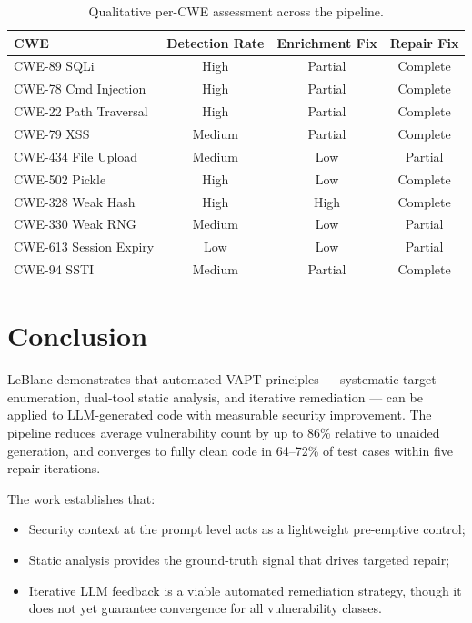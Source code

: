 \documentclass[11pt,a4paper]{article}
\begin{document}
\begin{table}[H]
\centering\small
\begin{tabular}{@{}lccc@{}}
\toprule
\textbf{CWE} & \textbf{Detection Rate} & \textbf{Enrichment Fix} & \textbf{Repair Fix} \\
\midrule
CWE-89  SQLi          & High   & Partial & Complete \\
CWE-78  Cmd Injection & High   & Partial & Complete \\
CWE-22  Path Traversal& High   & Partial & Complete \\
CWE-79  XSS           & Medium & Partial & Complete \\
CWE-434 File Upload   & Medium & Low     & Partial  \\
CWE-502 Pickle        & High   & Low     & Complete \\
CWE-328 Weak Hash     & High   & High    & Complete \\
CWE-330 Weak RNG      & Medium & Low     & Partial  \\
CWE-613 Session Expiry& Low    & Low     & Partial  \\
CWE-94  SSTI          & Medium & Partial & Complete \\
\bottomrule
\end{tabular}
\caption{Qualitative per-CWE assessment across the pipeline.}
\end{table}

\section{Conclusion}

LeBlanc demonstrates that automated VAPT principles — systematic target enumeration, dual-tool static analysis, and iterative remediation — can be applied to LLM-generated code with measurable security improvement. The pipeline reduces average vulnerability count by up to 86\% relative to unaided generation, and converges to fully clean code in 64–72\% of test cases within five repair iterations.

The work establishes that:
\begin{itemize}[nosep, leftmargin=*]
  \item Security context at the prompt level acts as a lightweight pre-emptive control;
  \item Static analysis provides the ground-truth signal that drives targeted repair;
  \item Iterative LLM feedback is a viable automated remediation strategy, though it does not yet guarantee convergence for all vulnerability classes.
\end{itemize}
\end{document}
